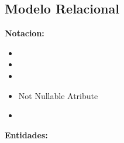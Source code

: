 \subsection{Modelo Relacional}

\textbf{Notacion:}
\begin{itemize}
	\item {} 
	\item {}
	\item {}
	\item Not Nullable Atribute
	\item {}
\end{itemize}

\vspace{2mm}
\textbf{Entidades:}
\vspace{1mm}

